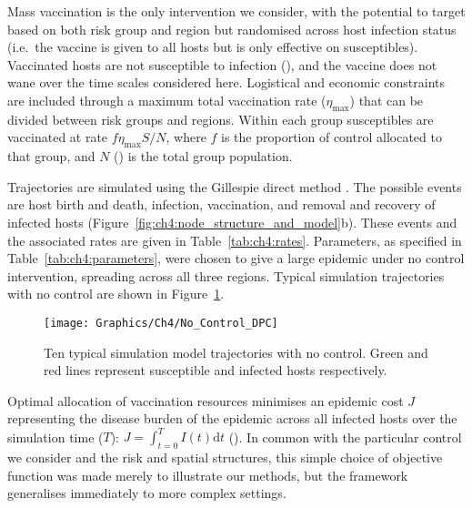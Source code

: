 Mass vaccination is the only intervention we consider, with the potential to target based on both risk group and region but randomised across host infection status (i.e.\ the vaccine is given to all hosts but is only effective on susceptibles). Vaccinated hosts are not susceptible to infection (), and the vaccine does not wane over the time scales considered here. Logistical and economic constraints are included through a maximum total vaccination rate ($\eta_{\mathrm{max}}$) that can be divided between risk groups and regions. Within each group susceptibles are vaccinated at rate $f\eta_{\mathrm{max}}S/N$, where $f$ is the proportion of control allocated to that group, and $N$ () is the total group population.

Trajectories are simulated using the Gillespie direct method \citep{gillespie_exact_1977}. The possible events are host birth and death, infection, vaccination, and removal and recovery of infected hosts (Figure~\ref{fig:ch4:node_structure_and_model}b). These events and the associated rates are given in Table~\ref{tab:ch4:rates}. Parameters, as specified in Table~\ref{tab:ch4:parameters}, were chosen to give a large epidemic under no control intervention, spreading across all three regions. Typical simulation trajectories with no control are shown in Figure~\ref{fig:ch4:no_control_dpc}.

\begin{figure}[htb]
    \begin{center}
        \texttt{[image: Graphics/Ch4/No\_Control\_DPC]}
        \caption{Ten typical simulation model trajectories with no control. Green and red lines represent susceptible and infected hosts respectively. }
        \label{fig:ch4:no_control_dpc}
    \end{center}
\end{figure}

Optimal allocation of vaccination resources minimises an epidemic cost $J$ representing the disease burden of the epidemic across all infected hosts over the simulation time ($T$): $J = \int_{t=0}^TI(t)\mathrm{d}t$ (). In common with the particular control we consider and the risk and spatial structures, this simple choice of objective function was made merely to illustrate our methods, but  the framework generalises immediately to more complex settings.

